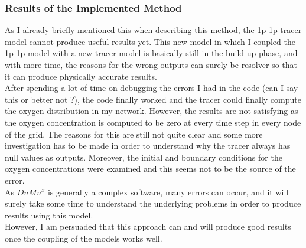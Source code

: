 \subsubsection*{Results of the Implemented Method}

As I already briefly mentioned this when describing this method, the 1p-1p-tracer model cannot produce useful results yet. This new model in which I coupled the 1p-1p model with a new tracer model is basically still in the build-up phase, and with more time, the reasons for the wrong outputs can surely be resolver so that it can produce physically accurate results.
\\After spending a lot of time on debugging the errors I had in the code {\color{red} (can I say this or better not ?)}, the code finally worked and the tracer could finally compute the oxygen distribution in my network. However, the results are not satisfying as the oxygen concentration is computed to be zero at every time step in every node of the grid. The reasons for this are still not quite clear and some more investigation has to be made in order to understand why the tracer always has null values as outputs. Moreover, the initial and boundary conditions for the oxygen concentrations were examined and this seems not to be the source of the error.
\\As $DuMu^x$ is generally a complex software, many errors can occur, and it will surely take some time to understand the underlying problems in order to produce results using this model.
\\However, I am persuaded that this approach can and will produce good results once the coupling of the models works well.

\newpage
